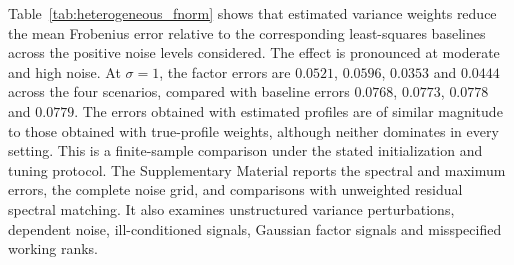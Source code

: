 \documentclass[numsec,webpdf,modern,large,namedate]{oup-authoring-template}
\theoremstyle{plain}
\theoremstyle{remark}
\newif\ifmarkchanges
\newenvironment{revision}{\begingroup\ifmarkchanges\color{red}\fi}{\endgroup}
\begin{document}
Table~\ref{tab:heterogeneous_fnorm} shows that estimated variance weights reduce the mean Frobenius error relative to the corresponding least-squares baselines across the positive noise levels considered. The effect is pronounced at moderate and high noise. At $\sigma=1$, the factor errors are $0.0521$, $0.0596$, $0.0353$ and $0.0444$ across the four scenarios, compared with baseline errors $0.0768$, $0.0773$, $0.0778$ and $0.0779$. The errors obtained with estimated profiles are of similar magnitude to those obtained with true-profile weights, although neither dominates in every setting. This is a finite-sample comparison under the stated initialization and tuning protocol.
\begin{revision}
The Supplementary Material reports the spectral and maximum errors, the complete noise grid, and comparisons with unweighted residual spectral matching. It also examines unstructured variance perturbations, dependent noise, ill-conditioned signals, Gaussian factor signals and misspecified working ranks.

\end{revision}
\end{document}
